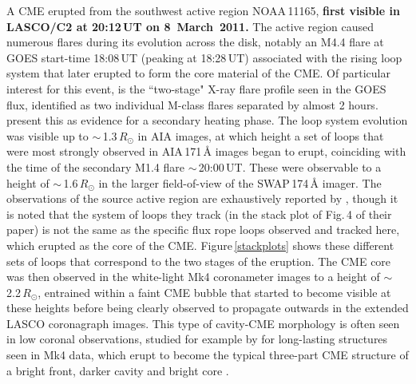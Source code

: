 \documentclass[namedreferences]{solarphysics}
\begin{document}
\begin{article}
A CME erupted from the southwest active region NOAA\,11165, {\bf first visible in LASCO/C2 at 20:12\,UT on 8~March~2011.} The active region caused numerous flares during its evolution across the disk, notably an M4.4 flare at GOES start-time 18:08\,UT (peaking at 18:28\,UT) associated with the rising loop system that later erupted to form the core material of the CME. Of particular interest for this event, is the ``two-stage" X-ray flare profile seen in the GOES flux, identified as two individual M-class flares separated by almost 2 hours.  present this as evidence for a secondary heating phase. The loop system evolution was visible up to $\sim$\,1.3\,$R_{\odot}$ in AIA images, at which height a set of loops that were most strongly observed in AIA\,171\,{\AA} images began to erupt, coinciding with the time of the secondary M1.4 flare $\sim$\,20:00\,UT. These were observable to a height of $\sim$\,1.6\,$R_{\odot}$ in the larger field-of-view of the SWAP\,174\,{\AA} imager. The observations of the source active region are exhaustively reported by , though it is noted that the system of loops they track (in the stack plot of Fig.\,4 of their paper) is not the same as the specific flux rope loops observed and tracked here, which erupted as the core of the CME. Figure\,\ref{stackplots} shows these different sets of loops that correspond to the two stages of the eruption. The CME core was then observed in the white-light Mk4 coronameter images to a height of $\sim$\,2.2\,$R_{\odot}$, entrained within a faint CME bubble that started to become visible at these heights before being clearly observed to propagate outwards in the extended LASCO coronagraph images. This type of cavity-CME morphology is often seen in low coronal observations, studied for example by  for long-lasting structures seen in Mk4 data, which erupt to become the typical three-part CME structure of a bright front, darker cavity and bright core \cite{1986JGR....9110951I}.  %


\end{article}
\end{document}
